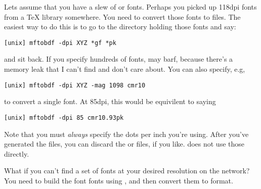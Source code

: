 Lets assume that you have a slew of {\GF} or {\PK} fonts.
Perhaps you picked up 118dpi fonts from a {\TeX} library somewhere.
You need to convert those fonts to {\BDF} files.
The easiest way to do this is to go to the directory holding those fonts
and say:
\begin{verbatim}
[unix] mftobdf -dpi XYZ *gf *pk  
\end{verbatim}
and sit back. If you specify hundreds of fonts, {\mftobdf} may barf,
because there's a memory leak that I can't find and don't care about.
You can also specify, e.g,
\begin{verbatim}
[unix] mftobdf -dpi XYZ -mag 1098 cmr10
\end{verbatim}
to convert a single font. At 85dpi, this would be equivilent to saying
\begin{verbatim}
[unix] mftobdf -dpi 85 cmr10.93pk
\end{verbatim}

Note that you must {\em always} specify the dots per inch you're
using.  After you've generated the {\BDF} files, you can discard the
{\PK} or {\GF} files, if you like. {\xtex} does not use those directly.


What if you can't find a set of fonts
at your desired resolution on the network?
You need to build the font fonts using {\MetaFont},
and then convert them to {\BDF} format.

